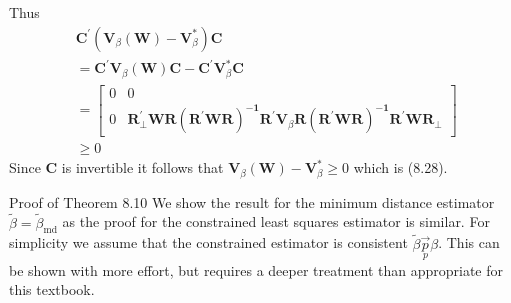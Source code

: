 \documentclass[10pt]{article}
\begin{document}
Thus
$$
\begin{aligned}
&\boldsymbol{C}^{\prime}\left(\boldsymbol{V}_{\beta}(\boldsymbol{W})-\boldsymbol{V}_{\beta}^{*}\right) \boldsymbol{C} \\
&=\boldsymbol{C}^{\prime} \boldsymbol{V}_{\beta}(\boldsymbol{W}) \boldsymbol{C}-\boldsymbol{C}^{\prime} \boldsymbol{V}_{\beta}^{*} \boldsymbol{C} \\
&=\left[\begin{array}{cc}
0 & 0 \\
0 & \boldsymbol{R}_{\perp}^{\prime} \boldsymbol{W} \boldsymbol{R}\left(\boldsymbol{R}^{\prime} \boldsymbol{W} \boldsymbol{R}\right)^{-\mathbf{1}} \boldsymbol{R}^{\prime} \boldsymbol{V}_{\beta} \boldsymbol{R}\left(\boldsymbol{R}^{\prime} \boldsymbol{W} \boldsymbol{R}\right)^{-\mathbf{1}} \boldsymbol{R}^{\prime} \boldsymbol{W} \boldsymbol{R}_{\perp}
\end{array}\right] \\
&\geq 0
\end{aligned}
$$
Since $\boldsymbol{C}$ is invertible it follows that $\boldsymbol{V}_{\beta}(\boldsymbol{W})-\boldsymbol{V}_{\beta}^{*} \geq 0$ which is (8.28).

Proof of Theorem 8.10 We show the result for the minimum distance estimator $\widetilde{\beta}=\widetilde{\beta}_{\mathrm{md}}$ as the proof for the constrained least squares estimator is similar. For simplicity we assume that the constrained estimator is consistent $\widetilde{\beta} \underset{p}{\vec{p}} \beta$. This can be shown with more effort, but requires a deeper treatment than appropriate for this textbook.
\end{document}
